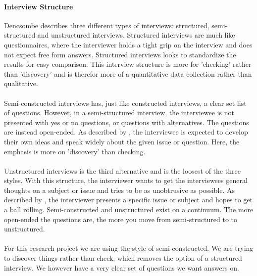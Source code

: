 \documentclass{article}
\begin{document}
\paragraph{Interview Structure}
Dencsombe describes three different types of interviews: structured, semi-structured and
unstructured interviews. Structured interviews are much like questionnaires, where
the interviewer holds a tight grip on the interview and does not expect free form answers.
Structured interviews looks to standardize the results for easy comparison.
This interview structure is more for 'checking' rather than 'discovery' and is
therefor more of a quantitative data collection rather than qualitative.
\\ \\
Semi-constructed interviews has, just like constructed interviews, a clear set
list of questions. However, in a semi-structured interview, the interviewee
is not presented with yes or no questions, or questions with alternatives.
The questions are instead open-ended. As described by \cite{denscombe}, the interviewee
is expected to develop their own ideas and speak widely about the given issue or question.
Here, the emphasis is more on 'discovery' than checking.
\\ \\
Unstructured interviews is the third alternative and is the loosest of the three styles.
With this structure, the interviewer wants to get the interviewees general thoughts
on a subject or issue and tries to be as unobtrusive as possible. As described by \cite{denscombe},
the interviewer presents a specific issue or subject and hopes to get a ball rolling.
Semi-constructed and unstructured exist on a continuum. The more open-ended the questions
are, the more you move from semi-structured to to unstructured.
\\ \\
For this research project we are using the style of semi-constructed.
We are trying to discover things rather than check, which removes the option
of a structured interview. We however have a very clear set of questions
we want answers on.
\end{document}
